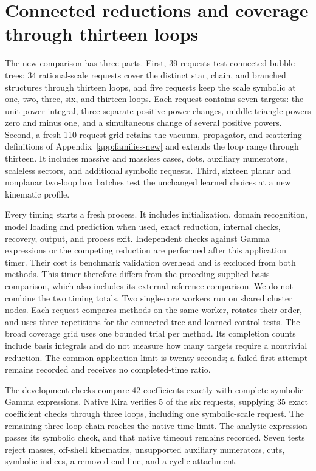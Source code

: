 \section{Connected reductions and coverage through thirteen loops}
\label{sec:notes-loop-tree-results}
The new comparison has three parts. First, 39 requests test connected bubble trees: 34 rational-scale requests cover the distinct star, chain, and branched structures through thirteen loops, and five requests keep the scale symbolic at one, two, three, six, and thirteen loops. Each request contains seven targets: the unit-power integral, three separate positive-power changes, middle-triangle powers zero and minus one, and a simultaneous change of several positive powers. Second, a fresh 110-request grid retains the vacuum, propagator, and scattering definitions of Appendix~\ref{app:families-new} and extends the loop range through thirteen. It includes massive and massless cases, dots, auxiliary numerators, scaleless sectors, and additional symbolic requests. Third, sixteen planar and nonplanar two-loop box batches test the unchanged learned choices at a new kinematic profile.

Every timing starts a fresh process. It includes initialization, domain recognition, model loading and prediction when used, exact reduction, internal checks, recovery, output, and process exit. Independent checks against Gamma expressions or the competing reduction are performed after this application timer. Their cost is benchmark validation overhead and is excluded from both methods. This timer therefore differs from the preceding supplied-basis comparison, which also includes its external reference comparison. We do not combine the two timing totals. Two single-core workers run on shared cluster nodes. Each request compares methods on the same worker, rotates their order, and uses three repetitions for the connected-tree and learned-control tests. The broad coverage grid uses one bounded trial per method. Its completion counts include basis integrals and do not measure how many targets require a nontrivial reduction. The common application limit is twenty seconds; a failed first attempt remains recorded and receives no completed-time ratio.

The development checks compare 42 coefficients exactly with complete symbolic Gamma expressions. Native Kira verifies 5 of the six requests, supplying 35 exact coefficient checks through three loops, including one symbolic-scale request. The remaining three-loop chain reaches the native time limit. The analytic expression passes its symbolic check, and that native timeout remains recorded. Seven tests reject masses, off-shell kinematics, unsupported auxiliary numerators, cuts, symbolic indices, a removed end line, and a cyclic attachment.

